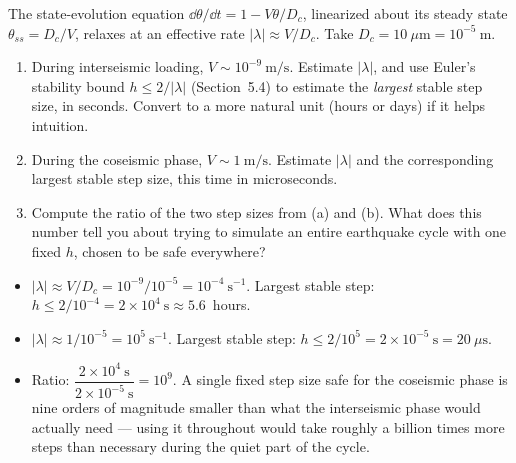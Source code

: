 The state-evolution equation $\dd\theta/\dd t = 1-V\theta/D_c$, linearized about its steady state $\theta_{ss}=D_c/V$, relaxes at an effective rate $|\lambda| \approx V/D_c$. Take $D_c = 10\ \mu\mathrm{m} = 10^{-5}\ \mathrm{m}$.

\begin{enumerate}[label=(\alph*)]
\item During interseismic loading, $V\sim10^{-9}\ \mathrm{m/s}$. Estimate $|\lambda|$, and use Euler's stability bound $h\le2/|\lambda|$ (Section~5.4) to estimate the \emph{largest} stable step size, in seconds. Convert to a more natural unit (hours or days) if it helps intuition.
\item During the coseismic phase, $V\sim1\ \mathrm{m/s}$. Estimate $|\lambda|$ and the corresponding largest stable step size, this time in microseconds.
\item Compute the ratio of the two step sizes from (a) and (b). What does this number tell you about trying to simulate an entire earthquake cycle with one fixed $h$, chosen to be safe everywhere?
\end{enumerate}

\solution
\begin{itemize}
\item[(a)] $|\lambda|\approx V/D_c = 10^{-9}/10^{-5} = 10^{-4}\ \mathrm{s^{-1}}$. Largest stable step: $h\le 2/10^{-4} = 2\times10^{4}\ \mathrm{s} \approx 5.6$~hours.
\item[(b)] $|\lambda|\approx 1/10^{-5} = 10^{5}\ \mathrm{s^{-1}}$. Largest stable step: $h\le 2/10^{5} = 2\times10^{-5}\ \mathrm{s} = 20\ \mu\mathrm{s}$.
\item[(c)] Ratio: $\dfrac{2\times10^{4}\ \mathrm{s}}{2\times10^{-5}\ \mathrm{s}} = 10^{9}$. A single fixed step size safe for the coseismic phase is nine orders of magnitude smaller than what the interseismic phase would actually need --- using it throughout would take roughly a billion times more steps than necessary during the quiet part of the cycle.
\end{itemize}

